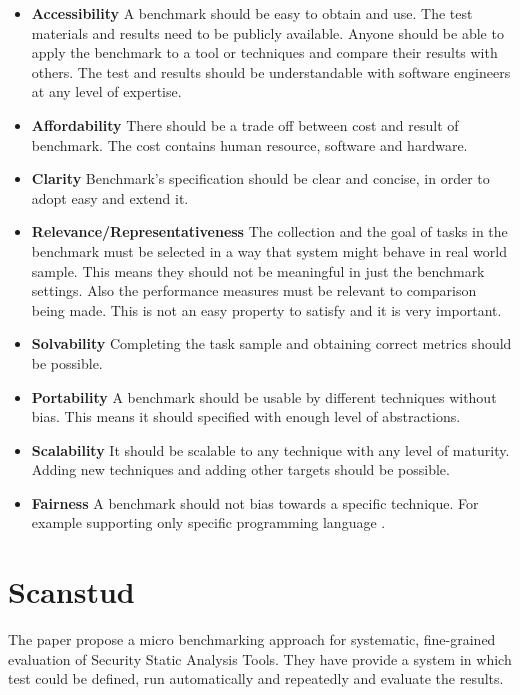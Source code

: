 \documentclass[authoryear,preprint]{sigplanconf}
\begin{document}
 \begin{itemize}
	\item \textbf{Accessibility} A benchmark should be easy to obtain and use. The test materials and results need to be publicly available. Anyone should be able to apply the benchmark to a tool or techniques and compare their results with others. The test and results should be understandable with software engineers at any level of expertise. 

	\item \textbf{Affordability} There should be a trade off between cost and result of benchmark. The cost contains human resource, software and hardware. 

	\item \textbf{Clarity} Benchmark's specification should be clear and concise, in order to adopt easy and extend it.
	
	\item \textbf{Relevance/Representativeness} The collection and the goal of tasks in the benchmark must be selected in a way that system might behave in real world sample. This means they should not be meaningful in just the benchmark settings. Also the performance measures must be relevant to comparison being made. This is not an easy property to satisfy and it is very important. 
	
	\item \textbf{Solvability} Completing the task sample and obtaining correct metrics should be possible. 
	
	\item \textbf{Portability} A benchmark should be usable by different techniques without bias. This means it should specified with enough level of abstractions. 
	
	\item \textbf{Scalability} It should be scalable to any technique with any level of maturity. Adding new techniques and adding other targets should be possible. 
	
	\item \textbf{Fairness} A benchmark should not bias towards a specific technique. For example supporting only specific programming language \cite{lu2005bugbench}.
\end{itemize}

\section{Scanstud}
\label{sec:sec_scanstud}
The paper propose a micro benchmarking approach for systematic, fine-grained evaluation of Security Static Analysis Tools. They have provide a system in which test could be defined, run automatically and repeatedly and evaluate the results. 
\end{document}
